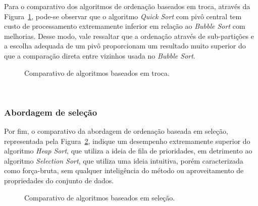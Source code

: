 \documentclass[conference]{IEEEtran}
\begin{document}
Para o comparativo dos algoritmos de ordenação baseados em troca, através da Figura~\ref{image: graph-troca}, pode-se observar que o algoritmo \textit{Quick Sort} com pivô central tem custo de processamento extremamente inferior em relação ao \textit{Bubble Sort} com melhorias. Desse modo, vale ressaltar que a ordenação através de sub-partições e a escolha adequada de um pivô proporcionam um resultado muito superior do que a comparação direta entre vizinhos usada no \textit{Bubble Sort}.
\begin{figure}

\centering
{}
\caption{Comparativo de algoritmos baseados em troca.}
\label{image: graph-troca}
\end{figure}

~\\
\subsubsection{Abordagem de seleção}
Por fim, o comparativo da abordagem de ordenação baseada em seleção, representada pela Figura~\ref{image: graph-selecao}, indique um desempenho extremamente superior do algoritmo \textit{Heap Sort}, que utiliza a ideia de fila de prioridades, em detrimento ao algoritmo \textit{Selection Sort}, que utiliza uma ideia intuitiva, porém caracterizada como força-bruta, sem qualquer inteligência do método ou aproveitamento de propriedades do conjunto de dados.

\begin{figure}

\centering
{}
\caption{Comparativo de algoritmos baseados em seleção.}
\label{image: graph-selecao}
\end{figure}
\end{document}
